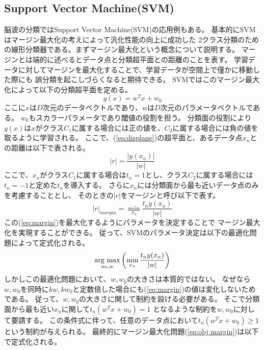 \subsection{Support Vector Machine(SVM)}
脳波の分類ではSupport Vector Machine(SVM)の応用例もある。
基本的にSVMはマージン最大化の考えによって汎化性能の向上に成功した
2クラス分類のための線形分類器である。まずマージン最大化という概念について説明する。
マージンとは端的に述べるとデータ点と分類超平面との距離のことを表す。
学習データに対してマージンを最大化することで、学習データが空間上で僅かに移動した際にも
誤分類を起こしづらくなると期待できる。
SVMではこのマージン最大化によって以下の分類超平面を定める。
\begin{equation}
    y(x) = w^Tx + w_0
    \label{eq:displane}
\end{equation}
ここに\(x\)は\(D\)次元のデータベクトルであり、\(w\)は\(D\)次元のパラメータベクトルである。
\(w_0\)もスカラーパラメータであり閾値の役割を担う。
分類面の役割により\(y(x)\)は\(x\)がクラス\(C_1\)に属する場合には正の値を、\(C_2\)に属する場合には負の値を取るように学習される。
ここで、(\ref{eq:displane})の超平面と、あるデータ点\(x_n\)との距離は以下で表される。
\begin{equation}
    |r| = \frac{|y(x_n)|}{|w|}
    \label{eq:distance}
\end{equation}
ここで、\(x_n\)がクラス\(C_1\)に属する場合は\(t_n=1\)とし、クラス\(C_2\)に属する場合には
\(t_n=-1\)と定めた\(t_n\)を導入する。
さらに\(x_n\)には分類面から最も近いデータ点のみを考慮することとし、
そのときの\(|r|\)をマージンと呼び以下で表す。
\begin{equation}
    |r|_{margin} = \min_{x_n}\frac{t_ny(x_n)}{|w|}
    \label{eq:margin}
\end{equation}
この(\ref{eq:margin})を最大化するようにパラメータを決定することで
マージン最大化を実現することができる。
従って、SVMのパラメータ決定は以下の最適化問題によって定式化される。
\begin{equation}
    \mathop{\rm arg~max}\limits_{w_0,w}\left(\min_{x_n}\frac{t_ny(x_n)}{|w|}\right)
    \label{eq:obj margin}
\end{equation}
しかしこの最適化問題において、\(w,w_0\)の大きさは本質的ではない。
なぜなら\(w,w_0\)を同時に\(kw,kw_0\)と定数倍した場合にも(\ref{eq:margin})の値は変化しないためである。
従って、\(w,w_0\)の大きさに関して制約を設ける必要がある。
そこで分類面から最も近い\(x_n\)に関して\(t_n(w^Tx+w_0)=1\)
となるような制約を\(w,w_0\)に対して要請する。
この条件式に伴って、任意のデータ点において\(t_n(w^Tx+w_0) \geq 1 \)という制約が与えられる。
最終的にマージン最大化問題(\ref{eq:obj margin})は以下で定式化される。
